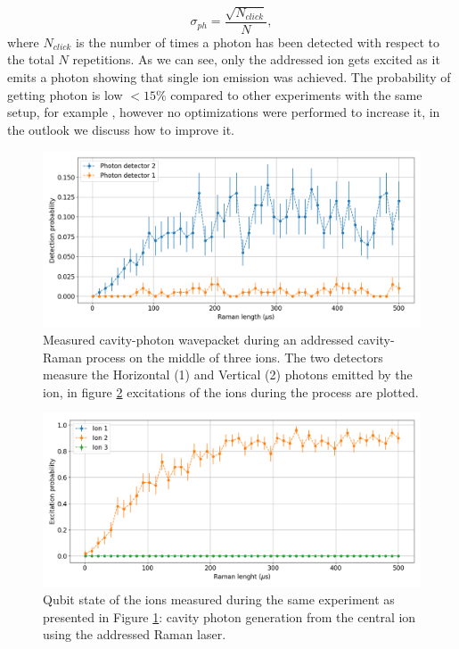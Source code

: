 \begin{equation}
\sigma_{ph} = \frac{\sqrt{N_{click}}}{N},
\end{equation}
where $N_{click}$ is the number of times a photon has been detected with respect to the total $N$ repetitions.
As we can see, only the addressed ion gets excited as it emits a photon showing that single ion emission was achieved. The probability of getting photon is low $<15 \%$ compared to other experiments with the same setup, for example \cite{Krutyanskiy2019}, however no optimizations were performed to increase it, in the outlook we discuss how to improve it.
\begin{figure}[H]
\centering
\includegraphics[width=\textwidth]{img/photonefficency_witherror}
\caption{Measured cavity-photon wavepacket during an addressed cavity-Raman process on the middle of three ions. The two detectors measure the Horizontal (1) and Vertical (2) photons emitted by the ion, in figure \ref{probion} excitations of the ions during the process are plotted.}
\label{probphoton}
\end{figure}
\begin{figure}[H]
\centering
\includegraphics[width=\textwidth]{img/ramanlength_witherrors}
\caption{Qubit state of the ions measured during the same experiment as presented in Figure \ref{probphoton}: cavity photon generation from the central ion using the addressed Raman laser.}
\label{probion}
\end{figure}
